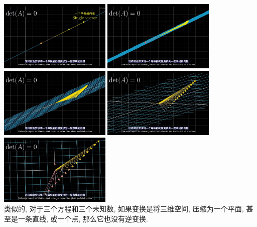 \documentclass[UTF8]{ctexart}
\begin{document}
\includegraphics[width=0.4\textwidth]{img/0049.png} 
\includegraphics[width=0.4\textwidth]{img/0050.png} \\
\includegraphics[width=0.4\textwidth]{img/0051.png} 
\includegraphics[width=0.4\textwidth]{img/0052.png} \\
\includegraphics[width=0.4\textwidth]{img/0053.png} \\


类似的, 对于三个方程和三个未知数, 如果变换是将三维空间, 压缩为一个平面, 甚至是一条直线, 或一个点, 那么它也没有逆变换.\\
\end{document}
